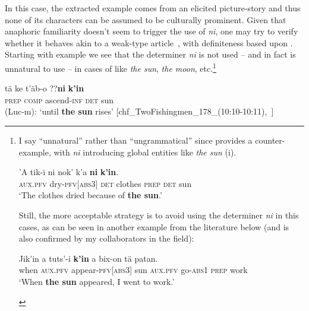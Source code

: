 \documentclass[output=paper
,modfonts
,nonflat]{langsci/langscibook}
\begin{document}
In this case, the extracted example comes from an elicited picture-story and thus none of its characters can be assumed to be culturally prominent. 
Given that anaphoric familiarity doesn't seem to trigger the use of \textit{ni}, one may try to verify whether it behaves akin to a weak-type article~\citep{Schwarz2013}, with definiteness based upon . Starting with example  we see that the determiner \textit{ni} is not used -- and in fact is unnatural to use -- in  cases of  like \textit{the sun}, \textit{the moon}, etc.\footnote{I say ``unnatural'' rather than ``ungrammatical'' since \citet{Knowles1984} provides a counter-example, with \textit{ni} introducing global entities like \textit{the sun} (i). 
	
	\begin{exe}
	 \label{ex:pico:n5i} 
		\gll 'A tik-i ni nok' k'a \textbf{ni} \textbf{k'in}.\\
		\textsc{\footnotesize aux.pfv} {\footnotesize dry-\textsc{pfv[abs3]}} \textsc{\footnotesize det} {\footnotesize clothes} \textsc{\footnotesize prep} \textsc{\footnotesize det} {\footnotesize sun}\\
		\glt \footnotesize `The clothes dried because of \textbf{the sun}.'~\citep[309]{Knowles1984}
	\end{exe} 
		
	Still, the more acceptable strategy is to avoid using the determiner \textit{ni} in this cases, as can be seen in another example from the literature below (and is also confirmed by my collaborators in the field):
	
	\begin{exe}
	\label{ex:pico:n5ii}\il{Yokot'an}
		\gll Jik'in a tuts'-i \textbf{k'in} a bix-on tä patan.\\
		{\footnotesize when} \textsc{\footnotesize aux.pfv} {\footnotesize appear-\textsc{pfv[abs3]}} {\footnotesize sun} \textsc{\footnotesize aux.pfv} {\footnotesize go-\textsc{abs1}} \textsc{\footnotesize prep} {\footnotesize work}\\
		\glt \footnotesize `When \textbf{the sun} appeared, I went to work.'~\citep[113]{SchumannGalvez2012}
	\end{exe}}


\ea \label{ex:pico:7}
\gll t\"a ke t'\"ab-o {\op}\textnormal{??}\textbf{ni}{\cp} \textbf{k'in} \\
\textsc{prep} \textsc{comp} ascend-\textsc{inf} \textsc{det} {sun} \\
\glt (Luc-m): `until \textbf{the sun} rises' [chf\_TwoFishingmen\_178\_(10:10-10:11),~\citealt{Delgado-Galvan2018archive}]
\z
\end{document}
